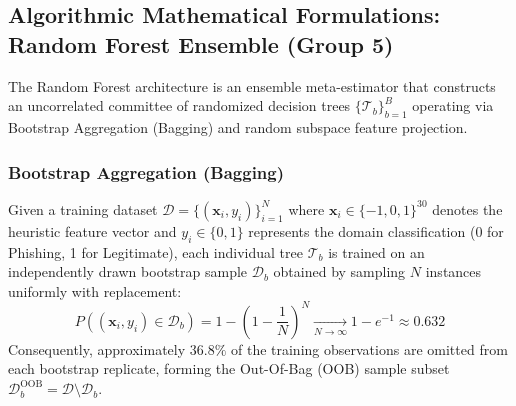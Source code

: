 \subsection{Algorithmic Mathematical Formulations: Random Forest Ensemble (Group 5)}
\label{sec:algo_random_forest}

The Random Forest architecture is an ensemble meta-estimator that constructs an uncorrelated committee of randomized decision trees $\{\mathcal{T}_b\}_{b=1}^B$ operating via Bootstrap Aggregation (Bagging) and random subspace feature projection. 

\subsubsection{Bootstrap Aggregation (Bagging)}
Given a training dataset $\mathcal{D} = \{(\mathbf{x}_i, y_i)\}_{i=1}^N$ where $\mathbf{x}_i \in \{-1, 0, 1\}^{30}$ denotes the heuristic feature vector and $y_i \in \{0, 1\}$ represents the domain classification (0 for Phishing, 1 for Legitimate), each individual tree $\mathcal{T}_b$ is trained on an independently drawn bootstrap sample $\mathcal{D}_b$ obtained by sampling $N$ instances uniformly with replacement:
\begin{equation}
    P\left((\mathbf{x}_i, y_i) \in \mathcal{D}_b\right) = 1 - \left(1 - \frac{1}{N}\right)^N \xrightarrow[N \to \infty]{} 1 - e^{-1} \approx 0.632
    \label{eq:bootstrap_prob}
\end{equation}
Consequently, approximately $36.8\%$ of the training observations are omitted from each bootstrap replicate, forming the Out-Of-Bag (OOB) sample subset $\mathcal{D}_b^{\text{OOB}} = \mathcal{D} \setminus \mathcal{D}_b$.

